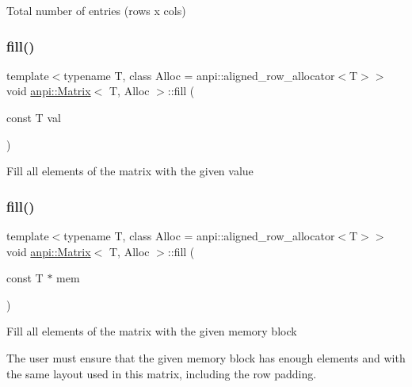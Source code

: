 Total number of entries (rows x cols) \mbox{\label{classanpi_1_1Matrix_a8c2b199355d418b1ef1cc2fd4490f41b}} 
\subsubsection{\texorpdfstring{fill()}{fill()}\hspace{0.1cm}{\footnotesize\ttfamily [1/4]}}
{\footnotesize\ttfamily template$<$typename T, class Alloc = anpi\+::aligned\+\_\+row\+\_\+allocator$<$\+T$>$$>$ \\
void \hyperlink{classanpi_1_1Matrix}{anpi\+::\+Matrix}$<$ T, Alloc $>$\+::fill (\begin{DoxyParamCaption}\item[{const T}]{val }\end{DoxyParamCaption})}

Fill all elements of the matrix with the given value \mbox{\label{classanpi_1_1Matrix_a386b5f83b6e8584ed471c8a1440dfd87}} 
\subsubsection{\texorpdfstring{fill()}{fill()}\hspace{0.1cm}{\footnotesize\ttfamily [2/4]}}
{\footnotesize\ttfamily template$<$typename T, class Alloc = anpi\+::aligned\+\_\+row\+\_\+allocator$<$\+T$>$$>$ \\
void \hyperlink{classanpi_1_1Matrix}{anpi\+::\+Matrix}$<$ T, Alloc $>$\+::fill (\begin{DoxyParamCaption}\item[{const T $\ast$}]{mem }\end{DoxyParamCaption})}

Fill all elements of the matrix with the given memory block

The user must ensure that the given memory block has enough elements and with the same layout used in this matrix, including the row padding. \mbox{\label{classanpi_1_1Matrix_a05234fe0be03642e146712340321fc3d}} 
